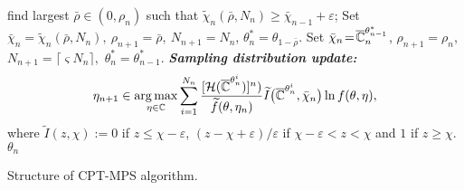 \begin{algorithm}
\begin{algorithmic}
             \State find largest $\bar \rho \in (0, \rho_n)$ such that $\widetilde\chi_{n}(\bar \rho,N_n)\geq \bar\chi_{n-1}+\varepsilon$;             
              \State Set $\bar \chi_{n}\! =\! \widetilde \chi_{n}(\bar \rho,N_n),~ \rho_{n+1}  \!=\! \bar \rho,~N_{n+1} \!=\! N_{n}$, 
              $\theta^*_{n} \!=\! \theta_{1- \bar \rho}$. \label{step:3b} 
              \Else
	      \State Set $\bar \chi_{n}  \!=\! \overline {\mathbb{C}}_n^{\theta^*_{n-1}}$, $\rho_{n+1} \!=\! \rho_n$, $N_{n+1} \!=\! \lceil\varsigma N_{n}\rceil,$ 
          $\theta^*_{n} \!=\! \theta^*_{n-1}$.\label{step:3c}
	      \EndIf
	    	  \State \textbf{\textit{Sampling distribution update:}}
		                         \begin{align*} 
\eta_{n+1} \in \mathop{\rm arg\,max}_{\eta \in \mathbb{C}}\sum_{i=1}^{N_n}\frac{[\mathcal{H}(\overline {\mathbb{C}}^{\theta^i_n})]^n)}{\widetilde f(\theta,\eta_n)}
\widetilde I\big(\overline {\mathbb{C}}^{\theta^i_n},\bar \chi_{n}\big) \ln f(\theta,\eta),
                            \end{align*}
                            where $\widetilde I(z,\chi):= 0$ if $z\leq \chi-\varepsilon$, $(z-\chi+\varepsilon)/ \varepsilon$ if $\chi-\varepsilon<z<\chi$ and $1$ if $z\geq \chi$.
\EndFor
{} $\theta_n$
\end{algorithmic}
\caption{Structure of  CPT-MPS algorithm.}
\label{alg:mras}
\end{algorithm}



